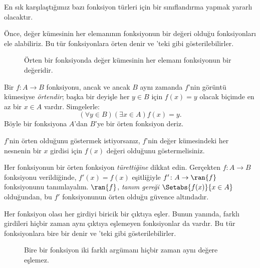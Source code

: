 \documentclass[../../../include/open-logic-section]{subfiles}
\begin{document}

\begin{explain}
En sık karşılaştığımız bazı fonksiyon türleri için bir sınıflandırma yapmak
yararlı olacaktır.

Önce, değer kümesinin her elemanının fonksiyonun bir değeri olduğu
fonksiyonları ele alabiliriz. Bu tür fonksiyonlara örten denir ve
'teki gibi gösterilebilirler.

\begin{figure}
  \caption{Örten bir fonksiyonda değer kümesinin her elemanı fonksiyonun bir
    değeridir.}
\end{figure}
\end{explain}

\begin{defn}
Bir $f \colon A \rightarrow B$ fonksiyonu, ancak ve ancak $B$ aynı zamanda
$f$'nin görüntü kümesiyse \emph{örtendir}; başka bir deyişle her $y \in B$
için $f(x)=y$ olacak biçimde en az bir $x \in A$ vardır. Simgelerle:
\[
  (\forall y \in B)(\exists x \in A)f(x) = y.
\]
Böyle bir fonksiyona $A$'dan $B$'ye bir örten fonksiyon deriz.
\end{defn}

\begin{explain}
$f$'nin örten olduğunu göstermek istiyorsanız, $f$'nin değer kümesindeki her
nesnenin bir $x$ girdisi için $f(x)$ değeri olduğunu göstermelisiniz.

Her fonksiyonun bir örten fonksiyon \emph{türettiğine} dikkat edin. Gerçekten
$f \colon A \to B$ fonksiyonu verildiğinde, $f'(x)=f(x)$ eşitliğiyle
$f' \colon A \to \ran{f}$ fonksiyonunu tanımlayalım. $\ran{f}$,
\emph{tanım gereği} $\Setabs{f(x)}{x \in A}$ olduğundan, bu $f'$
fonksiyonunun örten olduğu güvence altındadır.
\end{explain}

\begin{explain}
Her fonksiyon olası her girdiyi biricik bir çıktıya eşler. Bunun yanında,
farklı girdileri hiçbir zaman aynı çıktıya eşlemeyen fonksiyonlar da vardır.
Bu tür fonksiyonlara bire bir denir ve
'teki gibi gösterilebilirler.
\begin{figure}
  \caption{Bire bir fonksiyon iki farklı argümanı hiçbir zaman aynı
    değere eşlemez.}
\end{figure}
\end{explain}
\end{document}
